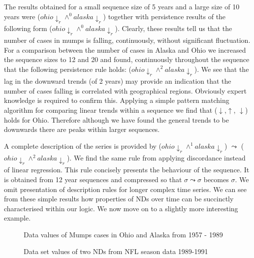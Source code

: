 The results obtained for a small sequence size of 5 years and a large
size of 10 years were  ($ohio\downarrow_r \wedge^0 alaska\downarrow_r$)
together with persistence results of the following form 
($ohio\downarrow_r \wedge^0 alaska\downarrow_r$). Clearly, these results tell us
that the number of cases in mumps is falling, continuously, without
significant fluctuation. For a comparison between the
number of cases in Alaska and Ohio we increased the sequence sizes to
12 and 20 and found, continuously throughout the sequence that the
following persistence rule holds: 
($ohio\downarrow_r \wedge^2 alaska\downarrow_r$). We see that the lag in
the downward trends (of 2 years) may provide an indication that the number of
cases falling is correlated with geographical regions. Obviously
expert knowledge is required to confirm this. 
Applying a simple pattern matching algorithm for comparing linear
trends within a sequence we find that 
($\downarrow$,$\uparrow$, $\downarrow$) holds for Ohio. Therefore
although we have found the general trends to be downwards there are
peaks within larger sequences.

\smallskip
A complete description of the series is provided by ($ohio\downarrow_r
\wedge^1 alaska\downarrow_r$) $\leadsto$ ($ohio\downarrow_r
\wedge^2 alaska\downarrow_r$). We find the same rule from applying
discordance instead of linear regression. This rule concisely presents
the behaviour of the sequence. It is obtained from 12 year sequences
and compressed so that $\sigma \leadsto \sigma$ becomes $\sigma$. We
omit presentation of description rules for longer complex time series.
We can see from these simple results how properties of NDs over time
can be succinctly characterised within our logic. We now move on to a
slightly more interesting example.

\medskip

\begin{figure}
\centerline{}
\caption{\label{graph:mumps_ohio_1}\scriptsize{Data values of Mumps
cases in Ohio and Alaska from 1957 - 1989}}
\end{figure}


\begin{figure}
\centerline{}
\caption{\label{graph:profb_1}\scriptsize{Data set values of two NDs
from NFL season data 1989-1991}}
\end{figure}



